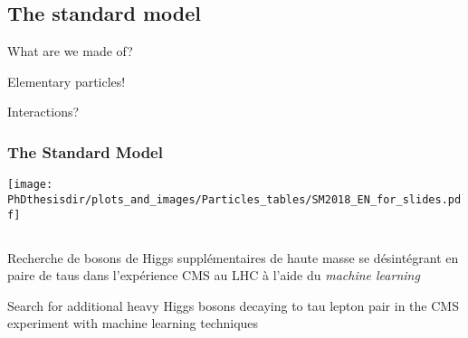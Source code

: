 \subsection*{The standard model}

\begin{frame}
\begin{center}
\Large What are we made of?
\end{center}

\pause\vfill

\begin{center}
\Large Elementary particles!
\end{center}

\pause\vfill\vfill\vfill

\begin{center}
\Large Interactions?
\end{center}
\end{frame}

\begin{frame}
\frametitle{The Standard Model}
\begin{center}
\vspace{-5pt}
\texttt{[image: \\PhDthesisdir/plots\_and\_images/Particles\_tables/SM2018\_EN\_for\_slides.pdf]}
\vspace{-5pt}
\end{center}
\end{frame}

\subsection*{}
\begin{frame}
\begin{center}
\Large

Recherche de bosons de Higgs supplémentaires de haute masse se désintégrant en paire de taus dans l'expérience CMS au LHC à l'aide du \emph{machine learning}

\vfill

Search for additional heavy Higgs bosons decaying to tau lepton pair in the CMS experiment with machine learning techniques
\end{center}
\end{frame}


